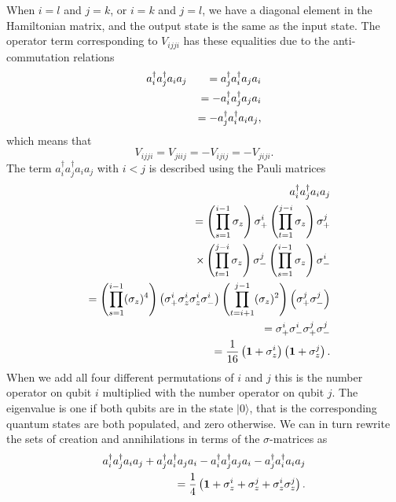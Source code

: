 \documentclass[aps,pra,twocolumn,floatfix]{revtex4}
\begin{document}
When $i=l$ and $j=k$, or $i=k$ and $j=l$, we have a
diagonal element in the Hamiltonian matrix, and the output state
is the same as the input state. 
The operator term corresponding to $V_{ijji}$ has these equalities due
to the anti-commutation relations
\begin{eqnarray}
a^\dag_i a^\dag_j a_i a_j &&=  a^\dag_j a^\dag_i a_j a_i \notag\\
&&= -a^\dag_i a^\dag_j a_j a_i \notag\\
&&= -a^\dag_j a^\dag_i a_i a_j,
\end{eqnarray}
which means that
\begin{equation}
\label{eq:Vdiags}
V_{ijji} = V_{jiij} = - V_{ijij} = - V_{jiji}.
\end{equation}
The term $a^\dag_i a^\dag_j a_i a_j$
with $i<j$ is described using the Pauli matrices
\begin{eqnarray}
&&a^\dag_i a^\dag_j a_i a_j \\ &&= 
\left(\prod_{s=1}^{i-1} \sigma_z \right) \sigma_+^i 
\left(\prod_{t=1}^{j-i} \sigma_z \right)
\sigma_+^j \notag \\
&&\times\left(\prod_{t=1}^{j-i} \sigma_z \right) \sigma_-^j
\left(\prod_{s=1}^{i-1} \sigma_z \right) \sigma_-^i \notag \\
&&=\left(\prod_{s=1}^{i-1} (\sigma_z)^4 \right) \left( \sigma_+^i \sigma_z^i
\sigma_z^i \sigma_-^i\right) \left(\prod_{t=i+1}^{j-1} (\sigma_z)^2 \right) \left(
\sigma_+^j  
\sigma_-^j\right) \notag \\
&&=\sigma_+^i\sigma_-^i\sigma_+^j\sigma_-^j \notag\\
&&=\frac{1}{16} \left( {\bf 1} + \sigma_z^i\right) \left( {\bf 1} + \sigma_z^j
\right). 
\end{eqnarray}
When we add all four different permutations of
$i$ and $j$ this is the number operator on qubit $i$ multiplied with
the number operator on qubit $j$.
The eigenvalue is one if both qubits are in
the state $ |0\rangle $, that is the corresponding quantum states are both
populated, and zero otherwise.
We can in turn rewrite the sets of creation and annihilations in terms of the 
$\sigma$-matrices as
\begin{eqnarray}
a^\dag_i a^\dag_j a_i a_j + a^\dag_j a^\dag_i a_j a_i
-a^\dag_i a^\dag_j a_j a_i-a^\dag_j a^\dag_i a_i a_j \notag \\
= \frac{1}{4} \left( {\bf 1} 
+\sigma_z^i + \sigma_z^j +\sigma_z^i\sigma_z^j \right).
\end{eqnarray}
\end{document}
